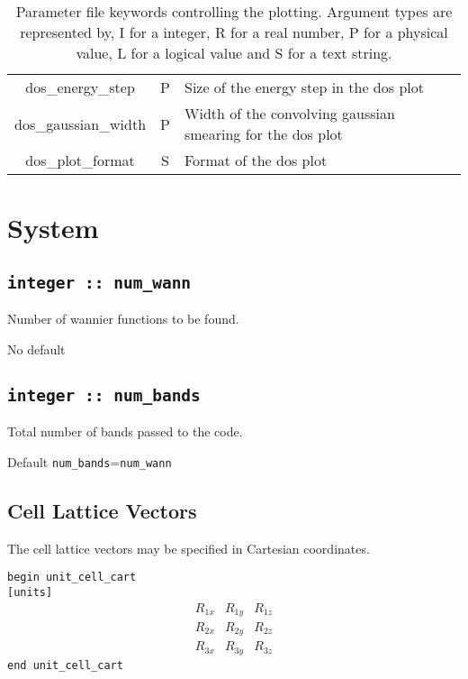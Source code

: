 \begin{table}
\begin{center}
\begin{tabular}{|c|c|p{6cm}|}
{\sc dos\_energy\_step }   & P & Size of the energy step in the dos plot \\
{\sc dos\_gaussian\_width }   & P & Width of the convolving gaussian
smearing for the dos plot \\
{\sc dos\_plot\_format }   & S & Format of the dos plot \\
\hline
\end{tabular}
\caption[Parameter file keywords controlling plotting.]
{Parameter file keywords controlling the  plotting.  Argument types
are represented by, I for a integer, R for a real number, P for a
physical value, L for a logical value and S for a text string.}
\label{parameter_keywords6}
\end{center}
\end{table}

\clearpage


\section{System}

\subsection[num\_wann]{\tt integer :: num\_wann}
Number of wannier functions to be found.

No default

\subsection[num\_bands]{\tt integer :: num\_bands} 

Total number of bands passed to the code.

Default \verb#num_bands#=\verb#num_wann#

\subsection[Cell Lattice Vectors]{Cell Lattice Vectors}

The cell lattice vectors may be specified in Cartesian coordinates.


\noindent \verb#begin unit_cell_cart# \\
\verb#[units]#
$$
\begin{array}{ccc}
R_{1x} & R_{1y} & R_{1z} \\
R_{2x} & R_{2y} & R_{2z} \\
R_{3x} & R_{3y} & R_{3z}
\end{array}
$$
\verb#end unit_cell_cart#

